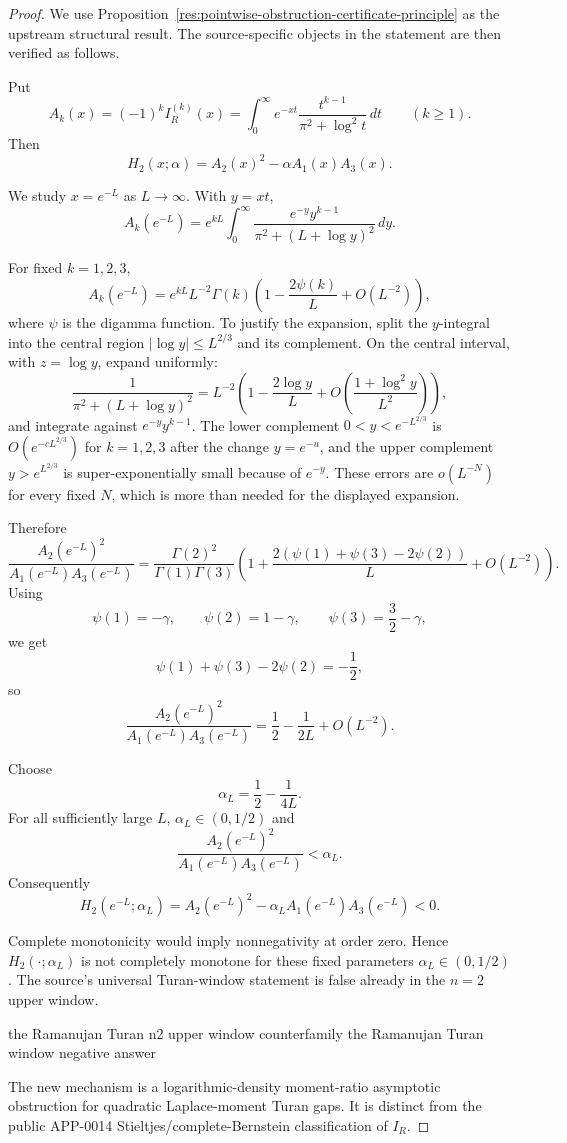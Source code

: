 \documentclass[11pt]{article}
\numberwithin{equation}{section}
\theoremstyle{definition}
\theoremstyle{remark}
\newcommand{\1}{\mathbf 1}
\begin{document}
\begin{proof}
We use Proposition~\ref{res:pointwise-obstruction-certificate-principle} as the upstream structural result. The source-specific objects in the statement are then verified as follows.

Put
\[
A_k(x)=(-1)^k I_R^{(k)}(x)
=\int_0^\infty e^{-xt}\frac{t^{k-1}}{\pi^2+\log^2 t}\,dt
\qquad (k\ge1).
\]
Then
\[
H_2(x;\alpha)=A_2(x)^2-\alpha A_1(x)A_3(x).
\]

We study \(x=e^{-L}\) as \(L\to\infty\). With \(y=xt\),
\[
A_k(e^{-L})
=
e^{kL}\int_0^\infty
\frac{e^{-y}y^{k-1}}
{\pi^2+(L+\log y)^2}\,dy.
\]

For fixed \(k=1,2,3\),
\[
A_k(e^{-L})
=
e^{kL}L^{-2}\Gamma(k)
\left(1-\frac{2\psi(k)}{L}+O(L^{-2})\right),
\]
where \(\psi\) is the digamma function. To justify the expansion, split the \(y\)-integral into the central region \(|\log y|\le L^{2/3}\) and its complement. On the central interval, with \(z=\log y\), expand uniformly:
\[
\frac{1}{\pi^2+(L+\log y)^2}
=
L^{-2}\left(1-\frac{2\log y}{L}+O\left(\frac{1+\log^2 y}{L^2}\right)\right),
\]
and integrate against \(e^{-y}y^{k-1}\). The lower complement \(0<y<e^{-L^{2/3}}\) is \(O(e^{-cL^{2/3}})\) for \(k=1,2,3\) after the change \(y=e^{-u}\), and the upper complement \(y>e^{L^{2/3}}\) is super-exponentially small because of \(e^{-y}\). These errors are \(o(L^{-N})\) for every fixed \(N\), which is more than needed for the displayed expansion.

Therefore
\[
\frac{A_2(e^{-L})^2}{A_1(e^{-L})A_3(e^{-L})}
=
\frac{\Gamma(2)^2}{\Gamma(1)\Gamma(3)}
\left(
1+\frac{2(\psi(1)+\psi(3)-2\psi(2))}{L}+O(L^{-2})
\right).
\]
Using
\[
\psi(1)=-\gamma,\qquad
\psi(2)=1-\gamma,\qquad
\psi(3)=\frac32-\gamma,
\]
we get
\[
\psi(1)+\psi(3)-2\psi(2)=-\frac12,
\]
so
\[
\frac{A_2(e^{-L})^2}{A_1(e^{-L})A_3(e^{-L})}
=
\frac12-\frac{1}{2L}+O(L^{-2}).
\]

Choose
\[
\alpha_L=\frac12-\frac{1}{4L}.
\]
For all sufficiently large \(L\), \(\alpha_L\in(0,1/2)\) and
\[
\frac{A_2(e^{-L})^2}{A_1(e^{-L})A_3(e^{-L})}<\alpha_L.
\]
Consequently
\[
H_2(e^{-L};\alpha_L)
=
A_2(e^{-L})^2-\alpha_L A_1(e^{-L})A_3(e^{-L})
<0.
\]

Complete monotonicity would imply nonnegativity at order zero. Hence \(H_2(\cdot;\alpha_L)\) is not completely monotone for these fixed parameters \(\alpha_L\in(0,1/2)\). The source's universal Turan-window statement is false already in the \(n=2\) upper window.

the Ramanujan Turan n2 upper window counterfamily
the Ramanujan Turan window negative answer

The new mechanism is a logarithmic-density moment-ratio asymptotic obstruction for quadratic Laplace-moment Turan gaps. It is distinct from the public APP-0014 Stieltjes/complete-Bernstein classification of \(I_R\).
\end{proof}
\end{document}

